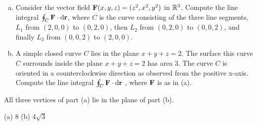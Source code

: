 \begin{question}[M317 2013D] %
\begin{enumerate}[(a)]
\item
Consider the vector field $\mathbf{F}(x, y, z) = (z^2 , x^2 , y^2)$ in 
$\mathbb{R}^3$. Compute the line integral $\oint_C \mathbf{F}\cdot\mathrm{d}\mathbf{r}$, where 
$C$ is the curve consisting of the three line segments,
$L_1$ from $(2, 0, 0)$ to $(0, 2, 0)$, then 
$L_2$ from $(0, 2, 0)$ to $(0, 0, 2)$, and finally 
$L_3$ from $(0, 0, 2)$ to $(2, 0, 0)$.
\item
A simple closed curve $C$ lies in the plane $x + y + z = 2$. 
The surface this curve $C$ surrounds inside the plane $x + y + z = 2$ 
has area $3$. The curve $C$ is oriented in a counterclockwise
direction as observed from the positive x-axis.
Compute the line integral $\oint_C\mathbf{F}\cdot \mathrm{d}\mathbf{r}$ , where $\mathbf{F}$ 
is as in (a).
\end{enumerate}
\end{question}

\begin{hint} 
All three vertices of part (a) lie in the plane of part (b).
\end{hint}

\begin{answer} 
(a) 8\qquad
(b) $4\sqrt{3}$
\end{answer}


